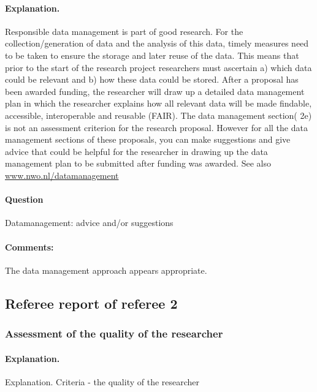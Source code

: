 \documentclass[twocolumn, serif, rga, numeric]{jote-article}
\begin{document}
\paragraph{Explanation.}
Responsible data management is part of good research. For the collection/generation of data and the analysis of this data, timely measures need to be taken to ensure the storage and later reuse of the data. This means that prior to the start of the research project researchers must ascertain a) which data could be relevant and b) how these data could be stored. After a proposal has been awarded funding, the researcher will draw up a detailed data management plan in which the researcher explains how all relevant data will be made findable, accessible, interoperable and reusable (FAIR). The data management section( 2e) is not an assessment criterion for the research proposal. However for all the data management sections of these proposals, you can make suggestions and give advice that could be helpful for the researcher in drawing up the data management plan to be submitted after funding was awarded. See also \href{www.nwo.nl/datamanagement}{www.nwo.nl/datamanagement}
\paragraph{Question}
Datamanagement: advice and/or suggestions
\paragraph{Comments:}
The data management approach appears appropriate.

 {}\subsection*{Referee report of referee 2} 
 {}\subsubsection*{Assessment of the quality of the researcher} 
\paragraph{Explanation.} Explanation. Criteria - the quality of the researcher
\end{document}
